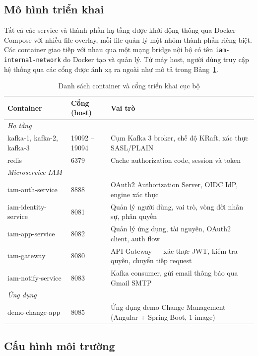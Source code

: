 \documentclass[../DoAn.tex]{subfiles}
\begin{document}
\subsection{Mô hình triển khai}

Tất cả các service và thành phần hạ tầng được khởi động thông qua Docker Compose với nhiều file overlay, mỗi file quản lý một nhóm thành phần riêng biệt. Các container giao tiếp với nhau qua một mạng bridge nội bộ có tên \texttt{iam-internal-network} do Docker tạo và quản lý. Từ máy host, người dùng truy cập hệ thống qua các cổng được ánh xạ ra ngoài như mô tả trong Bảng~\ref{tab:deploy-services}.

\begin{table}[H]
\centering
\caption{Danh sách container và cổng triển khai cục bộ}
\label{tab:deploy-services}
\footnotesize
\begin{tabular}{|p{4.0cm}|p{2.0cm}|p{7.0cm}|}
\hline
\textbf{Container} & \textbf{Cổng (host)} & \textbf{Vai trò} \\ \hline
\multicolumn{3}{|l|}{\textit{Hạ tầng}} \\ \hline
kafka-1, kafka-2, kafka-3 & 19092 -- 19094 & Cụm Kafka 3 broker, chế độ KRaft, xác thực SASL/PLAIN \\ \hline
redis & 6379 & Cache authorization code, session và token \\ \hline
\multicolumn{3}{|l|}{\textit{Microservice IAM}} \\ \hline
iam-auth-service & 8888 & OAuth2 Authorization Server, OIDC IdP, engine xác thực \\ \hline
iam-identity-service & 8081 & Quản lý người dùng, vai trò, vòng đời nhân sự, phân quyền \\ \hline
iam-app-service & 8082 & Quản lý ứng dụng, tài nguyên, OAuth2 client, auth flow \\ \hline
iam-gateway & 8080 & API Gateway — xác thực JWT, kiểm tra quyền, chuyển tiếp request \\ \hline
iam-notify-service & 8083 & Kafka consumer, gửi email thông báo qua Gmail SMTP \\ \hline
\multicolumn{3}{|l|}{\textit{Ứng dụng}} \\ \hline
demo-change-app & 8085 & Ứng dụng demo Change Management (Angular + Spring Boot, 1 image) \\ \hline
\end{tabular}
\end{table}

\subsection{Cấu hình môi trường}
\end{document}
